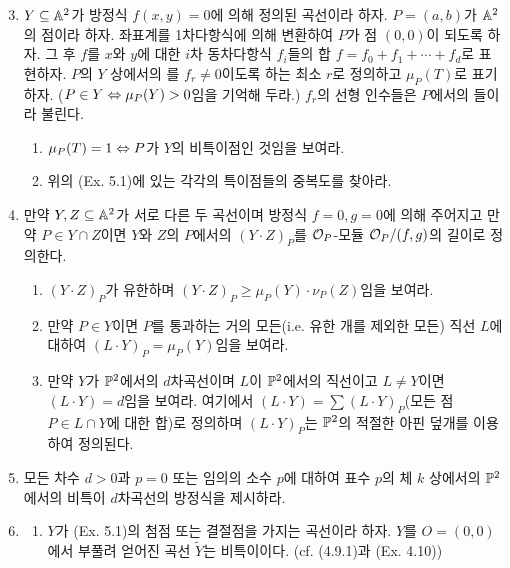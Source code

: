 	\begin{enumerate}[label=\tb{5.\arabic*.},itemindent=0mm,itemsep=2mm]
	\setcounter{enumi}{2}
	\item {} $Y\subseteq\mathbb{A}^2$가 방정식 $f(x,y)=0$에 의해 정의된 곡선이라 하자. $P=(a,b)$가 $\mathbb{A}^2$의 점이라 하자.
	좌표계를 1차다항식에 의해 변환하여 $P$가 점 $(0,0)$이 되도록 하자.
	그 후 $f$를 $x$와 $y$에 대한 $i$차 동차다항식 $f_i$들의 합 $f=f_0+f_1+\cdots+f_d$로 표현하자.
	$P$의 $Y$ 상에서의 를 $f_r\ne 0$이도록 하는 최소 $r$로 정의하고 $\mu_P(T)$로 표기하자.
	($P\in Y\Leftrightarrow\mu_P(Y)>0$임을 기억해 두라.) $f_r$의 선형 인수들은 $P$에서의 들이라 불린다.
	\begin{enumerate}[label=(\alph*)]
	\item $\mu_P(T)=1\Leftrightarrow P$가 $Y$의 비특이점인 것임을 보여라.
	\item 위의 (Ex. 5.1)에 있는 각각의 특이점들의 중복도를 찾아라.
	\end{enumerate}
	\item {} 만약 $Y,Z\subseteq\mathbb{A}^2$가 서로 다른 두 곡선이며 방정식 $f=0,g=0$에 의해 주어지고 만약 $P\in Y\cap Z$이면
	$Y$와 $Z$의 $P$에서의  $(Y\cdot Z)_P$를
	$\mathcal{O}_P$-모듈 $\mathcal{O}_P/(f,g)$의 길이로 정의한다.
	\begin{enumerate}[label=(\alph*)]
	\item $(Y\cdot Z)_P$가 유한하며 $(Y\cdot Z)_P\ge\mu_P(Y)\cdot\nu_P(Z)$임을 보여라.
	\item 만약 $P\in Y$이면 $P$를 통과하는 거의 모든(i.e. 유한 개를 제외한 모든) 직선 $L$에 대하여 $(L\cdot Y)_P=\mu_P(Y)$임을 보여라.
	\item 만약 $Y$가 $\mathbb{P}^2$에서의 $d$차곡선이며 $L$이 $\mathbb{P}^2$에서의 직선이고 $L\ne Y$이면 $(L\cdot Y)=d$임을 보여라.
	여기에서 $(L\cdot Y)=\sum(L\cdot Y)_P$(모든 점 $P\in L\cap Y$에 대한 합)로 정의하며
	$(L\cdot Y)_P$는 $\mathbb{P}^2$의 적절한 아핀 덮개를 이용하여 정의된다.
	\end{enumerate}
	\item 모든 차수 $d>0$과 $p=0$ 또는 임의의 소수 $p$에 대하여 표수 $p$의 체 $k$ 상에서의
	$\mathbb{P}^2$에서의 비특이 $d$차곡선의 방정식을 제시하라.
	\item {}
	\begin{enumerate}[label=(\alph*)]
	\item $Y$가 (Ex. 5.1)의 첨점 또는 결절점을 가지는 곡선이라 하자. $Y$를 $O=(0,0)$에서 부풀려 얻어진 곡선 $\tilde Y$는 비특이이다.
	(cf. (4.9.1)과 (Ex. 4.10))

\end{enumerate}
\end{enumerate}
